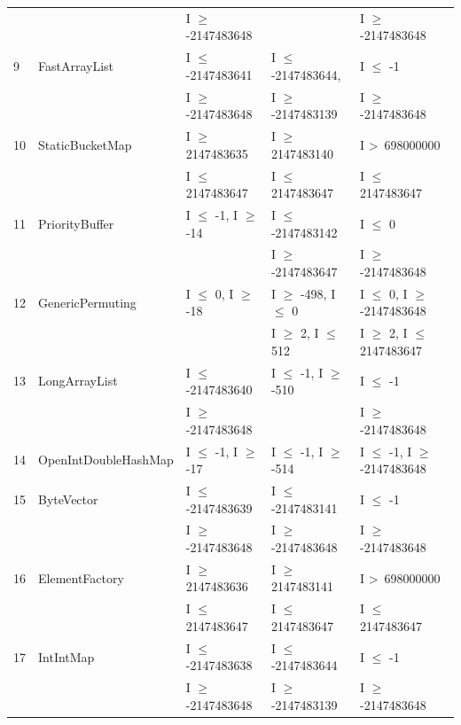 {\begin{longtable}{|l|l|l|l|l|}
	&                                             & I $\ge$ -2147483648			& 								& I $\ge$ -2147483648				\\	
9	& FastArrayList				& I $\le$ -2147483641 			& I $\le$ -2147483644, 			& I $\le$ -1								\\ 
	&                                             & I $\ge$ -2147483648			& I $\ge$ -2147483139			& I $\ge$ -2147483648				\\	
10	& StaticBucketMap			& I $\ge$ 2147483635			& I $\ge$ 2147483140			& I \textgreater~698000000					\\ 
	&                                             & I $\le$ 2147483647			& I $\le$ 2147483647			& I $\le$ 2147483647			   		\\	
11	& PriorityBuffer				& I $\le$ -1, I $\ge$ -14			& I $\le$  -2147483142			& I $\le$ 0								\\
	&                                             & 								& I $\ge$ -2147483647			& I $\ge$ -2147483648			   	\\	 
12	& GenericPermuting			& I $\le$ 0, I $\ge$ -18			& I $\ge$ -498, I $\le$ 0			& I $\le$ 0, I $\ge$ -2147483648	\\ 	%
	&                                             & 								& I $\ge$ 2, I $\le$ 512			& I $\ge$ 2, I $\le$ 2147483647	\\
13	& LongArrayList				& I $\le$ -2147483640			& I $\le$ -1, I $\ge$ -510			& I $\le$ -1								\\ 
	&                                             & I $\ge$ -2147483648			& 								& I $\ge$ -2147483648				\\
14	& OpenIntDoubleHashMap	& I $\le$ -1, I $\ge$ -17			& I $\le$ -1, I $\ge$ -514			& I $\le$ -1, I $\ge$ -2147483648	\\ 
15	& ByteVector					& I $\le$ -2147483639			& I $\le$ -2147483141			& I $\le$ -1								\\ 	%
	&                                             & I $\ge$ -2147483648			& I $\ge$ -2147483648			& I $\ge$ -2147483648				\\	
16	& ElementFactory				& I $\ge$ 2147483636			& I $\ge$ 2147483141			& I \textgreater~698000000					\\ 
	&                                             & I $\le$ 2147483647			& I $\le$ 2147483647			& I $\le$ 2147483647  					\\	
17	& IntIntMap					& I $\le$ -2147483638			& I $\le$ -2147483644			& I $\le$ -1								\\ 
	&                                             & I $\ge$ -2147483648			& I $\ge$ -2147483139			& I $\ge$ -2147483648 				\\	

\end{longtable}}
